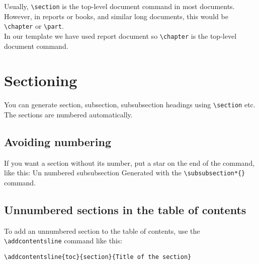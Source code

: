 Usually, \verb|\section| is the top-level document command in most documents. However, in reports or books, and similar long documents, this would be \verb|\chapter| or \verb|\part|. \\

In our template we have used report document so \verb|\chapter| is the top-level document command.

\section{Sectioning}

You can generate section, subsection, subsubsection headings using \verb|\section| etc. The sections are numbered automatically.

\subsection{Avoiding numbering}

If you want a section without its number, put a star on the end of the command, like this: Un numbered subsubsection Generated with the \verb|\subsubsection*{}| command.

\subsection{Unnumbered sections in the table of contents}

To add an unnumbered section to the table of contents, use the \verb|\addcontentsline| command like this:
\begin{lstlisting}
\addcontentsline{toc}{section}{Title of the section}
\end{lstlisting}

